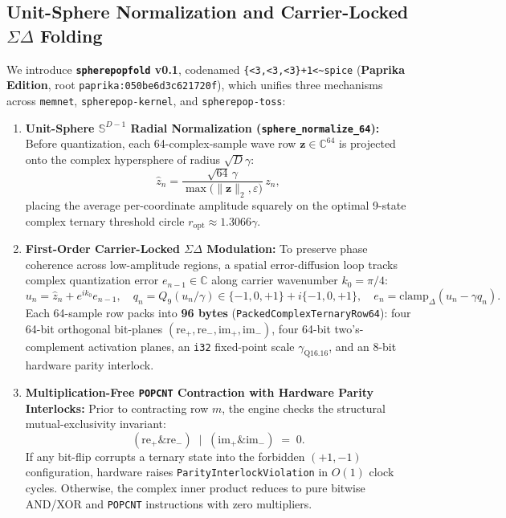 \documentclass[10pt,twocolumn,letterpaper]{article}
\begin{document}
\subsection{Unit-Sphere Normalization and Carrier-Locked $\Sigma\Delta$ Folding}
We introduce \textbf{\texttt{spherepopfold} v0.1}, codenamed \texttt{\{<3,<3,<3\}+1<\textasciitilde spice} (\textbf{Paprika Edition}, root \texttt{paprika:050be6d3c621720f}), which unifies three mechanisms across \texttt{memnet}, \texttt{spherepop-kernel}, and \texttt{spherepop-toss}:
\begin{enumerate}[leftmargin=1.4em,itemsep=1pt,topsep=2pt]
    \item \textbf{Unit-Sphere $\mathbb{S}^{D-1}$ Radial Normalization (\texttt{sphere\_normalize\_64}):} Before quantization, each 64-complex-sample wave row $\mathbf{z} \in \mathbb{C}^{64}$ is projected onto the complex hypersphere of radius $\sqrt{D}\gamma$:
    \begin{equation}
        \hat{z}_n = \frac{\sqrt{64}\,\gamma}{\max\!\bigl(\|\mathbf{z}\|_2, \varepsilon\bigr)}\,z_n,
    \end{equation}
    placing the average per-coordinate amplitude squarely on the optimal 9-state complex ternary threshold circle $r_{\text{opt}} \approx 1.3066\gamma$.
    \item \textbf{First-Order Carrier-Locked $\Sigma\Delta$ Modulation:} To preserve phase coherence across low-amplitude regions, a spatial error-diffusion loop tracks complex quantization error $e_{n-1} \in \mathbb{C}$ along carrier wavenumber $k_0 = \pi/4$:
    \begin{equation}
        u_n = \hat{z}_n + e^{i k_0} e_{n-1}, \quad q_n = Q_9(u_n/\gamma) \in \{-1,0,+1\} + i\{-1,0,+1\}, \quad e_n = \text{clamp}_{\Delta}(u_n - \gamma q_n).
    \end{equation}
    Each 64-sample row packs into \textbf{96 bytes} (\texttt{PackedComplexTernaryRow64}): four 64-bit orthogonal bit-planes $(\text{re}_+, \text{re}_-, \text{im}_+, \text{im}_-)$, four 64-bit two's-complement activation planes, an \texttt{i32} fixed-point scale $\gamma_{\text{Q16.16}}$, and an 8-bit hardware parity interlock.
    \item \textbf{Multiplication-Free \texttt{POPCNT} Contraction with Hardware Parity Interlocks:} Prior to contracting row $m$, the engine checks the structural mutual-exclusivity invariant:
    \begin{equation}
        (\text{re}_+ \mathbin{\&} \text{re}_-) \;\mathbin{|}\; (\text{im}_+ \mathbin{\&} \text{im}_-) \;=\; 0.
    \end{equation}
    If any bit-flip corrupts a ternary state into the forbidden $(+1,-1)$ configuration, hardware raises \texttt{ParityInterlockViolation} in $O(1)$ clock cycles. Otherwise, the complex inner product reduces to pure bitwise AND/XOR and \texttt{POPCNT} instructions with zero multipliers.
\end{enumerate}
\end{document}

